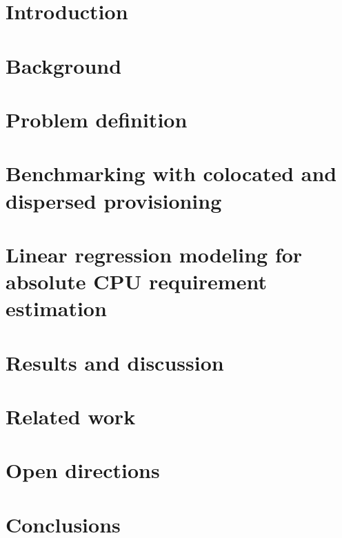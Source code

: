 
\section{Introduction}

\label{sec:arescue-intro}

\section{Background}
\label{sec:arescue-background}  

\section{Problem definition}

\label{sec:arescue-problem}

\section{Benchmarking with colocated and dispersed provisioning}

\label{sec:arescue-benchmark}

\section{Linear regression modeling for absolute CPU requirement estimation}

\label{sec:arescue-our-approach}

\section{Results and discussion}

\label{sec:arescue-experimental-eval}

%

\section{Related work}
\label{sec:2ndchap-related-work} 



\section{Open directions}

\label{sec:arescue-open-directions}

\section{Conclusions}

\label{sec:arescue-conclusions}
